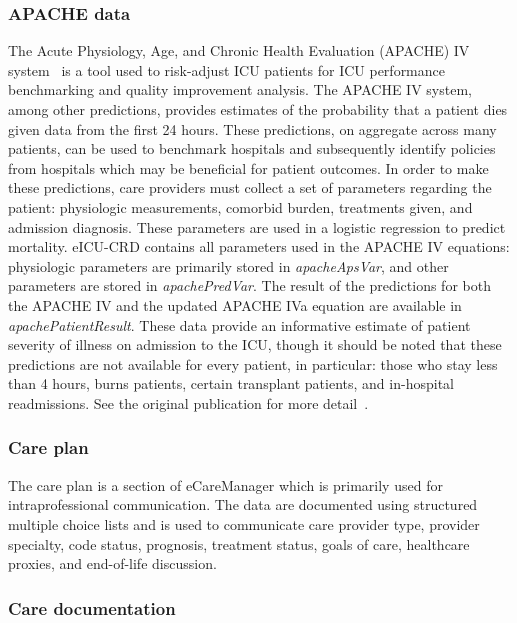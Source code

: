 \documentclass[english]{article}
\newcommand{\tblname}[1]{\emph{#1}}
\begin{document}
\subsubsection*{APACHE data}\label{apache-data}

The Acute Physiology, Age, and Chronic Health Evaluation (APACHE) IV system~\cite{zimmerman2006acute}
is a tool used to risk-adjust ICU patients
for ICU performance benchmarking and quality improvement analysis. The
APACHE IV system, among other predictions, provides estimates of the
probability that a patient dies given data from the first 24 hours.
These predictions, on aggregate across many patients, can be used to
benchmark hospitals and subsequently identify policies from hospitals
which may be beneficial for patient outcomes. In order to make these
predictions, care providers must collect a set of parameters regarding
the patient: physiologic measurements, comorbid burden, treatments
given, and admission diagnosis. These parameters are used in a logistic
regression to predict mortality. eICU-CRD contains all parameters used
in the APACHE IV equations: physiologic parameters are primarily stored
in \tblname{apacheApsVar}, and other parameters are stored in
\tblname{apachePredVar}. The result of the predictions for both the
APACHE IV and the updated APACHE IVa equation are available in
\tblname{apachePatientResult}. These data provide an informative estimate
of patient severity of illness on admission to the ICU, though it should
be noted that these predictions are not available for every patient, in
particular: those who stay less than 4 hours, burns patients, certain
transplant patients, and in-hospital readmissions. See the original
publication for more detail~\cite{zimmerman2006acute}.

\subsubsection*{Care plan}\label{care-plan}

The care plan is a section of eCareManager which is primarily used for
intraprofessional communication. The data are documented using structured
multiple choice lists and is used to communicate care provider type,
provider specialty, code status, prognosis, treatment status, goals of
care, healthcare proxies, and end-of-life discussion.

\subsubsection*{Care documentation}\label{care-documentation}
\end{document}

